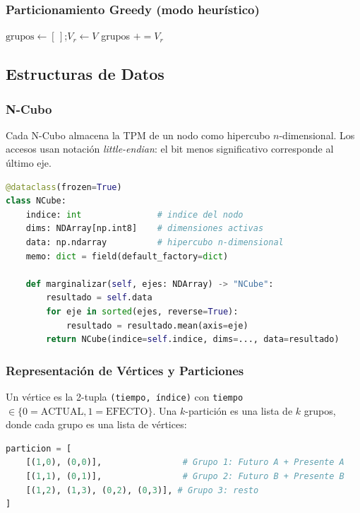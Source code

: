 \subsubsection{Particionamiento Greedy (modo heurístico)}

\begin{algorithm}[H]
\DontPrintSemicolon
{}
\BlankLine
$\text{grupos} \leftarrow [\,]$;\quad $V_r \leftarrow V$\;
grupos $\mathrel{+}= V_r$  
\;
\caption{\_greedy\_k\_partition: heurística greedy por iteraciones del MAO.}
\label{alg:greedy}
\end{algorithm}

\subsection{Estructuras de Datos}

\subsubsection{N-Cubo}

Cada N-Cubo almacena la TPM de un nodo como hipercubo $n$-dimensional. Los accesos usan notación \textit{little-endian}: el bit menos significativo corresponde al último eje.

\begin{lstlisting}[language=Python, caption={Estructura esencial del N-Cubo.}]
@dataclass(frozen=True)
class NCube:
    indice: int               # indice del nodo
    dims: NDArray[np.int8]    # dimensiones activas
    data: np.ndarray          # hipercubo n-dimensional
    memo: dict = field(default_factory=dict)

    def marginalizar(self, ejes: NDArray) -> "NCube":
        resultado = self.data
        for eje in sorted(ejes, reverse=True):
            resultado = resultado.mean(axis=eje)
        return NCube(indice=self.indice, dims=..., data=resultado)
\end{lstlisting}

\subsubsection{Representación de Vértices y Particiones}

Un vértice es la 2-tupla \texttt{(tiempo, índice)} con \texttt{tiempo} $\in \{0=\text{ACTUAL}, 1=\text{EFECTO}\}$. Una $k$-partición es una lista de $k$ grupos, donde cada grupo es una lista de vértices:

\begin{lstlisting}[language=Python, caption={Ejemplo de 3-partición de 4 nodos.}]
particion = [
    [(1,0), (0,0)],                # Grupo 1: Futuro A + Presente A
    [(1,1), (0,1)],                # Grupo 2: Futuro B + Presente B
    [(1,2), (1,3), (0,2), (0,3)], # Grupo 3: resto
]
\end{lstlisting}

